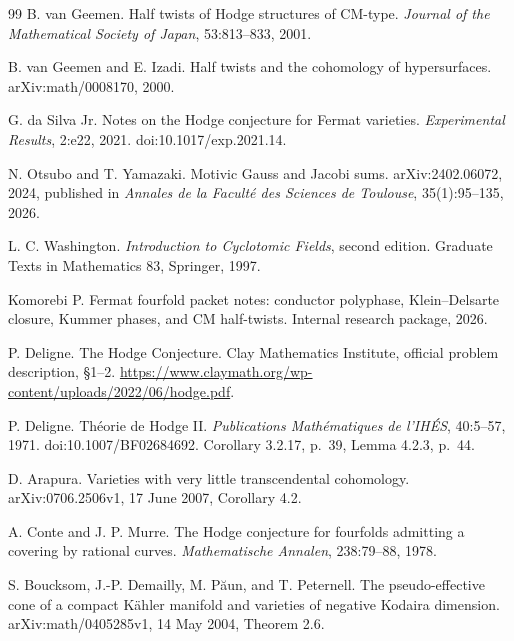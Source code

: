 {\begin{thebibliography}{99}
B. van Geemen.
\newblock Half twists of Hodge structures of CM-type.
\newblock \emph{Journal of the Mathematical Society of Japan}, 53:813--833, 2001.

B. van Geemen and E. Izadi.
\newblock Half twists and the cohomology of hypersurfaces.
\newblock arXiv:math/0008170, 2000.


G. da Silva Jr.
\newblock Notes on the Hodge conjecture for Fermat varieties.
\newblock \emph{Experimental Results}, 2:e22, 2021.
\newblock doi:10.1017/exp.2021.14.

N. Otsubo and T. Yamazaki.
\newblock Motivic Gauss and Jacobi sums.
\newblock arXiv:2402.06072, 2024, published in \emph{Annales de la Facult\'e des Sciences de Toulouse}, 35(1):95--135, 2026.

L. C. Washington.
\newblock \emph{Introduction to Cyclotomic Fields}, second edition.
\newblock Graduate Texts in Mathematics 83, Springer, 1997.

Komorebi P.
\newblock Fermat fourfold packet notes: conductor polyphase, Klein--Delsarte closure, Kummer phases, and CM half-twists.
\newblock Internal research package, 2026.

P. Deligne.
\newblock The Hodge Conjecture.
\newblock Clay Mathematics Institute, official problem description, \S1--2.
\newblock \url{https://www.claymath.org/wp-content/uploads/2022/06/hodge.pdf}.


P. Deligne.
\newblock Th\'eorie de Hodge II.
\newblock \emph{Publications Math\'ematiques de l'IH\'ES}, 40:5--57, 1971.
\newblock doi:10.1007/BF02684692.
\newblock Corollary 3.2.17, p.~39, Lemma 4.2.3, p.~44.


D. Arapura.
\newblock Varieties with very little transcendental cohomology.
\newblock arXiv:0706.2506v1, 17 June 2007, Corollary 4.2.


A. Conte and J. P. Murre.
\newblock The Hodge conjecture for fourfolds admitting a covering by rational curves.
\newblock \emph{Mathematische Annalen}, 238:79--88, 1978.


S. Boucksom, J.-P. Demailly, M. P\u{a}un, and T. Peternell.
\newblock The pseudo-effective cone of a compact K\"ahler manifold and varieties of negative Kodaira dimension.
\newblock arXiv:math/0405285v1, 14 May 2004, Theorem 2.6.



\end{thebibliography}}
